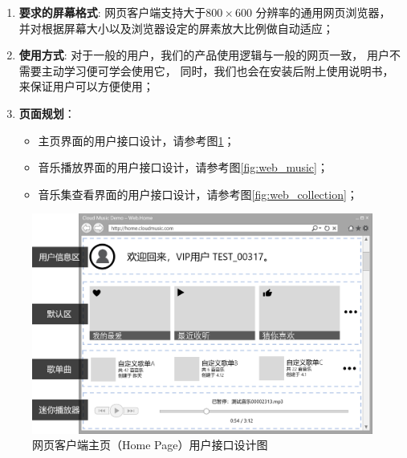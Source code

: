 \begin{enumerate}
	\item \textbf{要求的屏幕格式}:
		网页客户端支持大于$800 \times 600$ 分辨率的通用网页浏览器，
		并对根据屏幕大小以及浏览器设定的屏素放大比例做自动适应；
	\item \textbf{使用方式}:
		对于一般的用户，我们的产品使用逻辑与一般的网页一致，
			用户不需要主动学习便可学会使用它，
		同时，我们也会在安装后附上使用说明书，来保证用户可以方便使用；
	\item \textbf{页面规划}： 
	\begin{itemize}
		\item 主页界面的用户接口设计，请参考图\ref{fig:web_home}；
		\item 音乐播放界面的用户接口设计，请参考图\ref{fig:web_music}；
		\item 音乐集查看界面的用户接口设计，请参考图\ref{fig:web_collection}；
	\end{itemize}
\end{enumerate}

\begin{figure}[h!]
  \centering

  \includegraphics[width=.95\linewidth]{figures/web_home}

  \caption{  \label{fig:web_home}
  		网页客户端主页（Home Page）用户接口设计图
    }
\end{figure}

